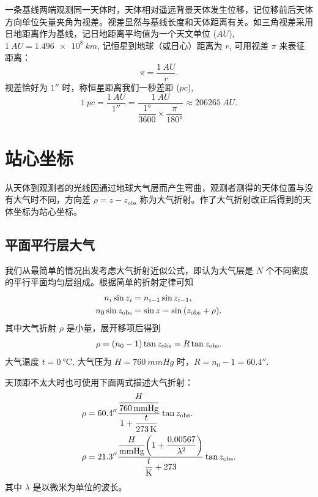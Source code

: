 \documentclass[UTF8, 12pt, a4paper, oneside, onecolumn, fontset=none]{ctexart}
\begin{document}
一条基线两端观测同一天体时，天体相对遥远背景天体发生位移，记位移前后天体方向单位矢量夹角为视差。视差显然与基线长度和天体距离有关。如三角视差采用日地距离作为基线，记日地距离平均值为一个天文单位 ($\unit{AU}$), $\qty{1}{AU}=\qty{1.496e8}{km}$, 记恒星到地球（或日心）距离为 $r$, 可用视差 $\pi$ 来表征距离：
\begin{equation}
\pi=\frac{\qty{1}{AU}}{r}.
\end{equation}
视差恰好为 $\ang{;; 1}$ 时，称恒星距离我们一秒差距 ($\unit{pc}$),
\begin{equation}
\qty{1}{pc}=\frac{\qty{1}{AU}}{\ang{;; 1}}=\frac{\qty{1}{AU}}{\dfrac{\ang{1;;}}{3600}\times\dfrac{\pi}{\ang{180;;}}}\approx\qty{206265}{AU}.
\end{equation}

\newpage
\section{站心坐标}
从天体到观测者的光线因通过地球大气层而产生弯曲，观测者测得的天体位置与没有大气时不同，方向差 $\rho=z-z_{\mathrm{obs}}$ 称为大气折射。作了大气折射改正后得到的天体坐标为站心坐标。

\subsection{平面平行层大气}
我们从最简单的情况出发考虑大气折射近似公式，即认为大气层是 $N$ 个不同密度的平行平面均匀层组成。根据简单的折射定律可知
\begin{align}
n_{i}\sin{z_{i}}&=n_{i-1}\sin{z_{i-1}},\\
n_{0}\sin{z_{\mathrm{obs}}}&=\sin{z}=\sin{\mleft(z_{\mathrm{obs}}+\rho\mright)}.
\end{align}
其中大气折射 $\rho$ 是小量，展开移项后得到
\begin{equation}
\rho=\mleft(n_{0}-1\mright)\tan{z_{\mathrm{obs}}}=R\tan{z_{\mathrm{obs}}}.
\end{equation}
大气温度 $t=\qty{0}{\degreeCelsius}$, 大气压为 $H=\qty{760}{mmHg}$ 时，$R=n_{0}-1=\ang{;; 60.4}$.

天顶距不太大时也可使用下面两式描述大气折射：
\begin{align}
\rho&=\ang{;; 60.4}\frac{\dfrac{H}{\qty{760}{mmHg}}}{1+\dfrac{t}{\qty{273}{K}}}\tan{z_{\mathrm{obs}}}.\\
\rho&=\ang{;; 21.3}\frac{\dfrac{H}{\unit{mmHg}}\mleft(1+\dfrac{0.00567}{\lambda^{2}}\mright)}{\dfrac{t}{\unit{K}}+273}\tan{z_{\mathrm{obs}}}.
\end{align}
其中 $\lambda$ 是以微米为单位的波长。
\end{document}
